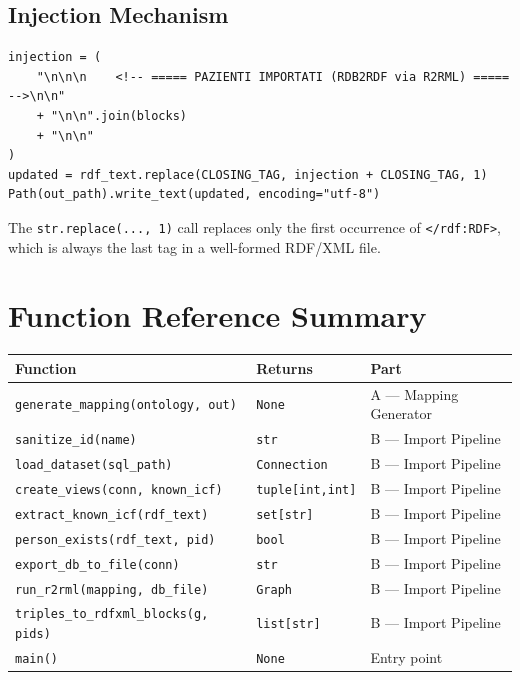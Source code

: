 ﻿\documentclass[12pt,a4paper]{article}
\begin{document}
\subsection{Injection Mechanism}

\begin{lstlisting}
injection = (
    "\n\n\n    <!-- ===== PAZIENTI IMPORTATI (RDB2RDF via R2RML) ===== -->\n\n"
    + "\n\n".join(blocks)
    + "\n\n"
)
updated = rdf_text.replace(CLOSING_TAG, injection + CLOSING_TAG, 1)
Path(out_path).write_text(updated, encoding="utf-8")
\end{lstlisting}

The \texttt{str.replace(..., 1)} call replaces only the first occurrence of \texttt{</rdf:RDF>}, which is always the last tag in a well-formed RDF/XML file.

\clearpage
\section{Function Reference Summary}

\begin{longtable}{@{}P{6.5cm}P{3cm}P{5.5cm}@{}}
\toprule
\textbf{Function} & \textbf{Returns} & \textbf{Part} \\
\midrule
\endhead
\texttt{generate\_mapping(ontology, out)} & \texttt{None} & A --- Mapping Generator \\
\texttt{sanitize\_id(name)} & \texttt{str} & B --- Import Pipeline \\
\texttt{load\_dataset(sql\_path)} & \texttt{Connection} & B --- Import Pipeline \\
\texttt{create\_views(conn, known\_icf)} & \texttt{tuple[int,int]} & B --- Import Pipeline \\
\texttt{extract\_known\_icf(rdf\_text)} & \texttt{set[str]} & B --- Import Pipeline \\
\texttt{person\_exists(rdf\_text, pid)} & \texttt{bool} & B --- Import Pipeline \\
\texttt{export\_db\_to\_file(conn)} & \texttt{str} & B --- Import Pipeline \\
\texttt{run\_r2rml(mapping, db\_file)} & \texttt{Graph} & B --- Import Pipeline \\
\texttt{triples\_to\_rdfxml\_blocks(g, pids)} & \texttt{list[str]} & B --- Import Pipeline \\
\texttt{main()} & \texttt{None} & Entry point \\
\bottomrule
\end{longtable}
\end{document}
